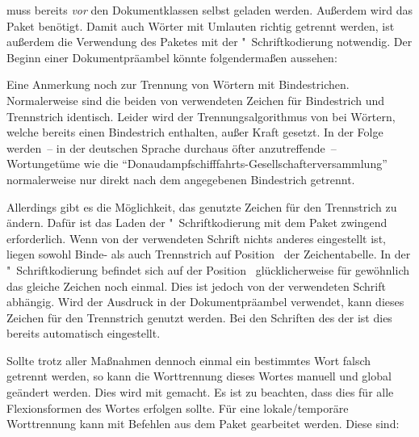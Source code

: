  muss bereits \emph{vor} den Dokumentklassen selbst geladen 
werden. Außerdem wird das Paket  benötigt. Damit auch Wörter mit 
Umlauten richtig getrennt werden, ist außerdem die Verwendung des Paketes 
 mit der "~Schriftkodierung notwendig. Der Beginn 
einer Dokumentpräambel könnte folgendermaßen aussehen:
%
\begin{quoting}[rightmargin=0pt]
\end{quoting}
%
Eine Anmerkung noch zur Trennung von Wörtern mit Bindestrichen. Normalerweise 
sind die beiden von  verwendeten Zeichen für Bindestrich und 
Trennstrich identisch. Leider wird der Trennungsalgorithmus von  
bei Wörtern, welche bereits einen Bindestrich enthalten, außer Kraft gesetzt. 
In der Folge werden~-- in der deutschen Sprache durchaus öfter anzutreffende~-- 
Wortungetüme wie die \enquote{Donaudampfschifffahrts-Gesellschafterversammlung} 
normalerweise nur direkt nach dem angegebenen Bindestrich getrennt. 

Allerdings gibt es die Möglichkeit, das genutzte Zeichen für den Trennstrich 
zu ändern. Dafür ist das Laden der "~Schriftkodierung mit dem Paket 
 zwingend erforderlich. Wenn von der verwendeten Schrift 
nichts anderes eingestellt ist, liegen sowohl Binde- als auch Trennstrich auf 
Position~ der Zeichentabelle. In der "~Schriftkodierung 
befindet sich auf der Position~ glücklicherweise für gewöhnlich das 
gleiche Zeichen noch einmal. Dies ist jedoch von der verwendeten Schrift 
abhängig. Wird der Ausdruck  in der 
Dokumentpräambel verwendet, kann dieses Zeichen für den Trennstrich genutzt 
werden. Bei den Schriften des \CDs der \TnUD ist dies bereits automatisch 
eingestellt.

Sollte trotz aller Maßnahmen dennoch einmal ein bestimmtes Wort falsch getrennt 
werden, so kann die Worttrennung dieses Wortes manuell und global geändert 
werden. Dies wird mit  
gemacht. Es ist zu beachten, dass dies für alle Flexionsformen des Wortes 
erfolgen sollte. Für eine lokale/temporäre Worttrennung kann mit Befehlen aus 
dem Paket  gearbeitet werden. Diese sind: 

